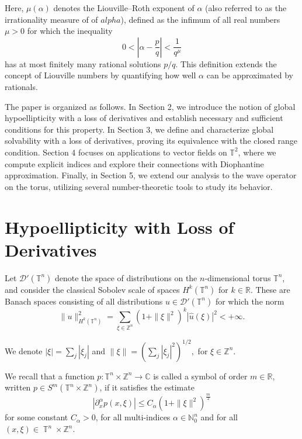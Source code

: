 \documentclass[11pt]{amsart}
\numberwithin{equation}{section}
\theoremstyle{definition}
\DeclareMathOperator{\T}{\mathbb{T}}
\begin{document}
 	 Here, \( \mu(\alpha) \) denotes the Liouville–Roth exponent of \( \alpha\) (also referred to as the irrationality measure of of \(alpha\)), defined as the infimum of all real numbers \( \mu > 0 \) for which the inequality  
 	 \[
 	 0 < \left| \alpha - \frac{p}{q} \right| < \frac{1}{q^\mu}
 	 \]
 	 has at most finitely many rational solutions \( p/q \). This definition extends the concept of Liouville numbers by quantifying how well \( \alpha \) can be approximated by rationals.  
 	 
 	 
 	 The paper is organized as follows. In Section 2, we introduce the notion of global hypoellipticity with a loss of derivatives and establish necessary and sufficient conditions for this property. In Section 3, we define and characterize global solvability with a loss of derivatives, proving its equivalence with the closed range condition. Section 4 focuses on applications to vector fields on \( \mathbb{T}^2 \), where we compute explicit indices and explore their connections with Diophantine approximation. Finally, in Section 5, we extend our analysis to the wave operator on the torus, utilizing several number-theoretic tools to study its behavior.
 

\section{Hypoellipticity with Loss of Derivatives}\label{Section_GH-r}


	Let \( \mathscr{D}'(\mathbb{T}^n) \) denote the space of distributions on the \( n \)-dimensional torus \( \mathbb{T}^n \), and consider the classical Sobolev scale of spaces \( H^k(\mathbb{T}^n) \) for \( k \in \mathbb{R} \). These are Banach spaces consisting of all distributions \( u \in \mathscr{D}'(\mathbb{T}^n) \) for which the norm  
	\[
	\|u\|_{H^k(\mathbb{T}^n)}^2 = \sum_{\xi \in \mathbb{Z}^n} (1 + \| \xi \|^2)^{k} |\widehat{u}(\xi)|^2 < +\infty.
	\]
	
	We denote  \( |\xi| = \sum_j |\xi_j| \)  and \( \|\xi\| = \left( \sum_j |\xi_j|^2 \right)^{1/2}, \)  for \( \xi \in \mathbb{Z}^n\).
		
	We recall that a function \( p: \mathbb{T}^n \times \mathbb{Z}^n \to \mathbb{C} \) is called a symbol of order \( m \in \mathbb{R} \), written \( p \in S^m(\mathbb{T}^n \times \mathbb{Z}^n) \), if it satisfies the estimate  
	\[
	|\partial_x^\alpha p(x, \xi)| \leq C_\alpha (1 + \|\xi\|^2)^{\frac{m}{2}}
	\]
	for some constant \( C_\alpha > 0 \), for all multi-indices \( \alpha \in \mathbb{N}_0^n \) and for all \( (x,\xi) \in \T^n\times\mathbb{Z}^n \).  
	
\end{document}
